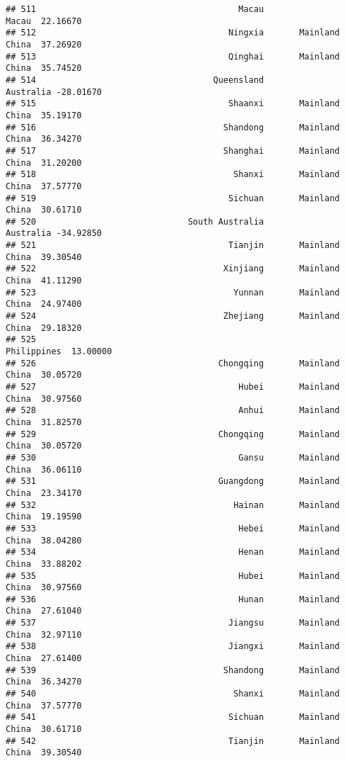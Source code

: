 \documentclass[
]{article}
\begin{document}
\begin{verbatim}
## 511                                        Macau                Macau  22.16670
## 512                                      Ningxia       Mainland China  37.26920
## 513                                      Qinghai       Mainland China  35.74520
## 514                                   Queensland            Australia -28.01670
## 515                                      Shaanxi       Mainland China  35.19170
## 516                                     Shandong       Mainland China  36.34270
## 517                                     Shanghai       Mainland China  31.20200
## 518                                       Shanxi       Mainland China  37.57770
## 519                                      Sichuan       Mainland China  30.61710
## 520                              South Australia            Australia -34.92850
## 521                                      Tianjin       Mainland China  39.30540
## 522                                     Xinjiang       Mainland China  41.11290
## 523                                       Yunnan       Mainland China  24.97400
## 524                                     Zhejiang       Mainland China  29.18320
## 525                                                       Philippines  13.00000
## 526                                    Chongqing       Mainland China  30.05720
## 527                                        Hubei       Mainland China  30.97560
## 528                                        Anhui       Mainland China  31.82570
## 529                                    Chongqing       Mainland China  30.05720
## 530                                        Gansu       Mainland China  36.06110
## 531                                    Guangdong       Mainland China  23.34170
## 532                                       Hainan       Mainland China  19.19590
## 533                                        Hebei       Mainland China  38.04280
## 534                                        Henan       Mainland China  33.88202
## 535                                        Hubei       Mainland China  30.97560
## 536                                        Hunan       Mainland China  27.61040
## 537                                      Jiangsu       Mainland China  32.97110
## 538                                      Jiangxi       Mainland China  27.61400
## 539                                     Shandong       Mainland China  36.34270
## 540                                       Shanxi       Mainland China  37.57770
## 541                                      Sichuan       Mainland China  30.61710
## 542                                      Tianjin       Mainland China  39.30540

\end{verbatim}
\end{document}
